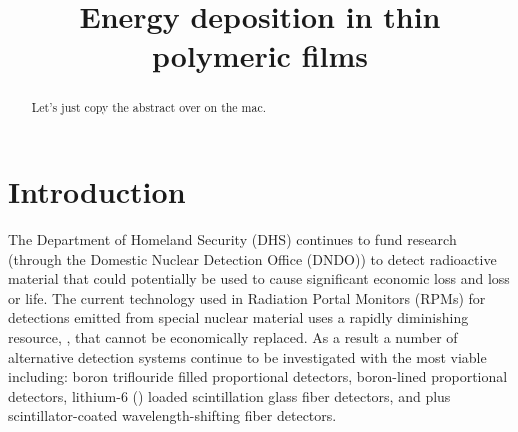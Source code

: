 \documentclass[draftcls,onecolumn]{IEEEtran}
\begin{document}
\title{Energy deposition in thin polymeric films}
\author{
}

\maketitle

\begin{abstract}


Let's just copy the abstract over on the mac.
\end{abstract}

\IEEEpeerreviewmaketitle

\section{Introduction}
\label{sec:Intro}
The Department of Homeland Security (DHS) continues to fund research (through the Domestic Nuclear Detection Office (DNDO)) to detect radioactive material that could potentially be used to cause significant economic loss and loss or life.  
The current technology used in Radiation Portal Monitors (RPMs) for detections emitted from special nuclear material uses a rapidly diminishing resource, , that cannot be economically replaced. 
As a result a number of alternative detection systems continue to be investigated with the most viable including: boron triflouride  filled proportional detectors, boron-lined proportional detectors, lithium-6 () loaded scintillation glass fiber detectors, and  plus scintillator-coated wavelength-shifting fiber detectors\cite{kouzes_neutron_2010}.  
\end{document}
